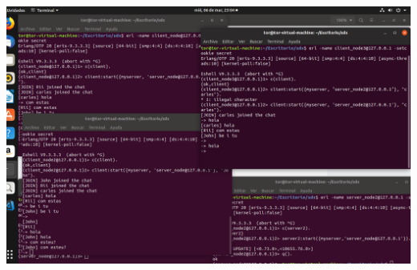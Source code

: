\documentclass[a4paper, 10pt]{article}
\begin{document}
\begin{enumerate}
  \includegraphics[width=\textwidth]{img4}\\\\
  
\end{enumerate}
\newpage
\end{document}
